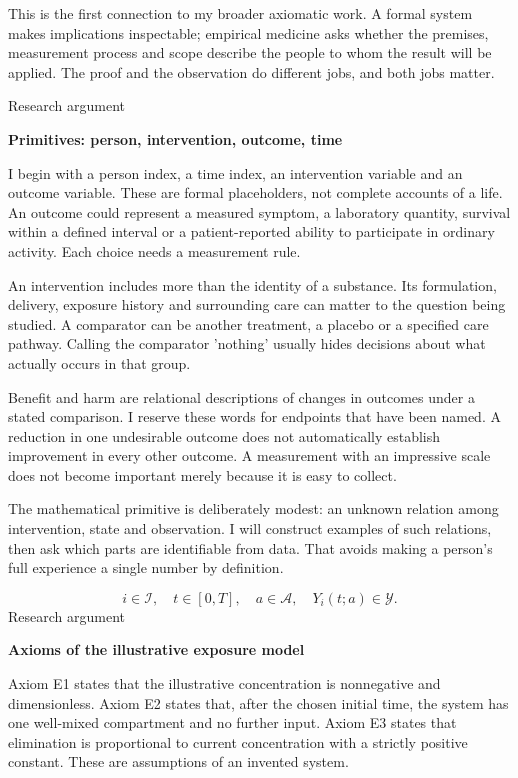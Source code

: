 \documentclass[10pt]{article}
\begin{document}
This is the first connection to my broader axiomatic work. A formal system makes implications inspectable; empirical medicine asks whether the premises, measurement process and scope describe the people to whom the result will be applied. The proof and the observation do different jobs, and both jobs matter.\par
\clearpage
{\small\color{accent}Research argument}\par
{\LARGE\bfseries\color{ink}Primitives: person, intervention, outcome, time}\par\vspace{7pt}
I begin with a person index, a time index, an intervention variable and an outcome variable. These are formal placeholders, not complete accounts of a life. An outcome could represent a measured symptom, a laboratory quantity, survival within a defined interval or a patient-reported ability to participate in ordinary activity. Each choice needs a measurement rule.\par
An intervention includes more than the identity of a substance. Its formulation, delivery, exposure history and surrounding care can matter to the question being studied. A comparator can be another treatment, a placebo or a specified care pathway. Calling the comparator 'nothing' usually hides decisions about what actually occurs in that group.\par
Benefit and harm are relational descriptions of changes in outcomes under a stated comparison. I reserve these words for endpoints that have been named. A reduction in one undesirable outcome does not automatically establish improvement in every other outcome. A measurement with an impressive scale does not become important merely because it is easy to collect.\par
The mathematical primitive is deliberately modest: an unknown relation among intervention, state and observation. I will construct examples of such relations, then ask which parts are identifiable from data. That avoids making a person's full experience a single number by definition.\par
\[i\in\mathcal I,\quad t\in[0,T],\quad a\in\mathcal A,\quad Y_i(t;a)\in\mathcal Y.\]
\clearpage
{\small\color{accent}Research argument}\par
{\LARGE\bfseries\color{ink}Axioms of the illustrative exposure model}\par\vspace{7pt}
Axiom E1 states that the illustrative concentration is nonnegative and dimensionless. Axiom E2 states that, after the chosen initial time, the system has one well-mixed compartment and no further input. Axiom E3 states that elimination is proportional to current concentration with a strictly positive constant. These are assumptions of an invented system.\par
\end{document}

